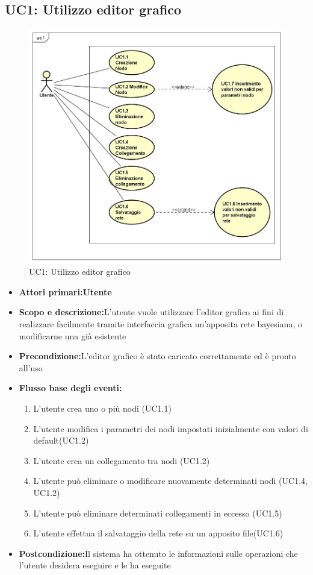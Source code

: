 \subsection{UC1: Utilizzo editor grafico}
\begin{figure} [H]
	\centering
	\includegraphics[scale=0.45]{Img/UC1}
	\caption{UC1: Utilizzo editor grafico}\label{}
\end{figure}
\begin{itemize}
	\item{\textbf{Attori primari:Utente}}
	\item{\textbf{Scopo e descrizione:}L'utente vuole utilizzare l'editor grafico ai fini di realizzare facilmente tramite interfaccia grafica un'apposita rete bayesiana, o modificarne una già esistente}
	\item{\textbf{Precondizione:}L'editor grafico è stato caricato correttamente ed è pronto all'uso}
	\item{\textbf{Flusso base degli eventi:}
		\begin{enumerate}
			\item{L'utente crea uno o più nodi (UC1.1)}
			\item{L'utente modifica i parametri dei nodi impostati inizialmente con valori di default(UC1.2)}
			\item{L'utente crea un collegamento tra nodi (UC1.2)}
			\item{L'utente può eliminare o modificare nuovamente determinati nodi (UC1.4, UC1.2)}
			\item{L'utente può eliminare determinati collegamenti in eccesso (UC1.5)}
			\item{L'utente effettua il salvataggio della rete su un apposito file(UC1.6)}
		\end{enumerate}
	}
	\item{\textbf{Postcondizione:}Il sistema ha ottenuto le informazioni sulle operazioni che l'utente desidera eseguire e le ha eseguite}
\end{itemize}
